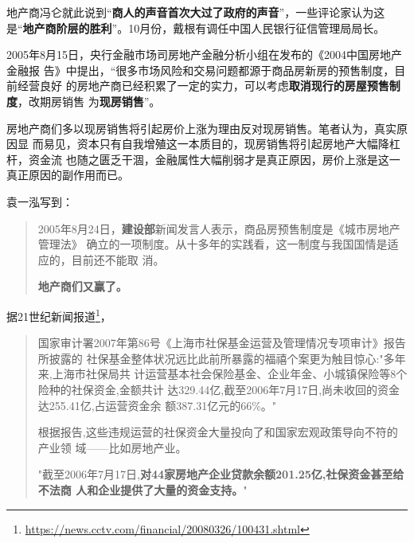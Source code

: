 地产商冯仑就此说到“\textbf{商人的声音首次大过了政府的声音}”，一些评论家认为这
是“\textbf{地产商阶层的胜利}”。10月份，戴根有调任中国人民银行征信管理局局长。






2005年8月15日，央行金融市场司房地产金融分析小组在发布的《2004中国房地产金融报
告》中提出，“很多市场风险和交易问题都源于商品房新房的预售制度，目前经营良好
的房地产商已经积累了一定的实力，可以考虑\textbf{取消现行的房屋预售制度}，改期房销售
为\textbf{现房销售}”。

房地产商们多以现房销售将引起房价上涨为理由反对现房销售。笔者认为，真实原因显
而易见，资本只有自我增殖这一本质目的，现房销售将引起房地产大幅降杠杆，资金流
也随之匮乏干涸，金融属性大幅削弱才是真正原因，房价上涨是这一真正原因的副作用而已。

袁一泓\cite{2011feiteng}写到：
\begin{quotation}
  2005年8月24日，\textbf{建设部}新闻发言人表示，商品房预售制度是《城市房地产管理法》
  确立的一项制度。从十多年的实践看，这一制度与我国国情是适应的，目前还不能取
  消。

  \textbf{地产商们又赢了。}
\end{quotation}



据21世纪新闻报道\footnote{\url{https://news.cctv.com/financial/20080326/100431.shtml}}，
\begin{quotation}
  国家审计署2007年第86号《上海市社保基金运营及管理情况专项审计》报告所披露的
  社保基金整体状况远比此前所暴露的福禧个案更为触目惊心:"多年来,上海市社保局共
  计运营基本社会保险基金、企业年金、小城镇保险等8个险种的社保资金,金额共计
  达329.44亿,截至2006年7月17日,尚未收回的资金达255.41亿,占运营资金余
  额387.31亿元的66\%。"

  根据报告,这些违规运营的社保资金大量投向了和国家宏观政策导向不符的产业领
  域——比如房地产业。

  "截至2006年7月17日,\textbf{对44家房地产企业贷款余额201.25亿,社保资金甚至给不法商
    人和企业提供了大量的资金支持。}"
\end{quotation}

